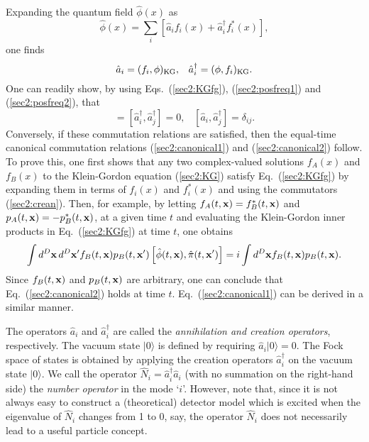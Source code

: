 \documentclass[12pt,nofootinbib,floatfix,aps,prd,showpacs,amsmath,amssymb,eqsecnum]{revtex4-2}
\begin{document}
Expanding the quantum field $\hat{\phi}(x)$ as
\begin{equation}
\hat{\phi}(x) = \sum_{i}\left[ \hat{a}_i f_i(x) + 
\hat{a}_i^\dagger f_i^*(x)\right],
\end{equation}
one finds
\begin{equation}
\hat{a}_i =  (f_i,\phi)_{\rm KG}, \;\;\;
\hat{a}_i^\dagger =  (\phi,f_i)_{\rm KG}.
\end{equation}
One can readily show, by using Eqs.~(\ref{sec2:KGfg}),
(\ref{sec2:posfreq1}) and (\ref{sec2:posfreq2}), that
\begin{equation}
[ \hat{a}_i ,\hat{a}_j ]  
= 
[ \hat{a}_i^\dagger, \hat{a}_j^\dagger ] = 0,\;\;\;
[ \hat{a}_i , \hat{a}_j^\dagger ] 
=  
\delta_{i j}. 
\label{sec2:crean}
\end{equation}
Conversely, if these commutation relations 
are satisfied, then the equal-time
canonical commutation relations (\ref{sec2:canonical1}) and
(\ref{sec2:canonical2}) follow.  To prove this, one first shows that any 
two complex-valued solutions $f_A(x)$ and $f_B(x)$ to the Klein-Gordon
equation (\ref{sec2:KG}) satisfy Eq.~(\ref{sec2:KGfg}) by expanding them
in terms of $f_i(x)$ and $f_i^*(x)$ and using the commutators
(\ref{sec2:crean}).  Then, for example, by
letting $f_A(t,{\bf x}) = f_B^*(t,{\bf x})$ and
$p_A(t,{\bf x}) = -p_B^*(t,{\bf x})$, at a given time $t$ 
and evaluating the Klein-Gordon
inner products in Eq.~(\ref{sec2:KGfg}) at time $t$,
one obtains
\begin{equation}
\int d^D{\bf x}\, d^D{\bf x}'
f_B(t,{\bf x})p_B(t,{\bf x}')\left[\hat{\phi}(t,{\bf x}),\hat{\pi}(t,{\bf
x}')\right]
= i\int d^D{\bf x}f_B(t,{\bf x})p_B(t,{\bf x}).
\end{equation}
Since $f_B(t,{\bf x})$ and $p_B(t,{\bf x})$ are arbitrary, one can
conclude that Eq.~(\ref{sec2:canonical2}) holds at time $t$. 
Eq.~(\ref{sec2:canonical1}) can be derived in a similar manner.

The operators $\hat{a}_i$ 
and $\hat{a}^\dagger_i$ are called the {\em 
annihilation and creation 
operators}, respectively.  The vacuum state $|0\rangle$ 
is defined by requiring 
$\hat{a}_i|0\rangle=0$.  The Fock space of states is obtained by applying
the creation operators $\hat{a}_i^\dagger$ on the vacuum state 
$|0\rangle$.  We call the operator 
$\hat{N}_i = \hat{a}_i^\dagger \hat{a}_i$ 
(with no summation on the right-hand side) the {\em number operator}
in the mode `$i$'.  
However, note that, since it is not always 
easy to construct a (theoretical) detector model which is excited when 
the eigenvalue of $\hat{N}_i$ 
changes from 1 to 0, say, the operator $\hat{N}_i$ 
does not necessarily lead to a useful particle concept.
\end{document}
